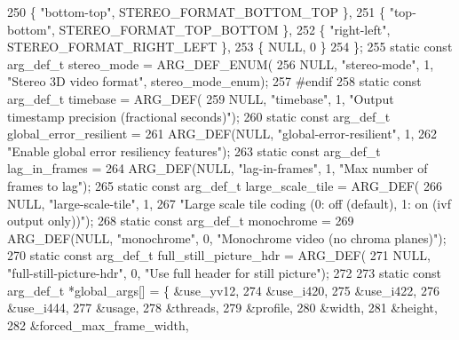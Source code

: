 \begin{DoxyCodeInclude}
{{250   \{ \textcolor{stringliteral}{"bottom-top"}, STEREO\_FORMAT\_BOTTOM\_TOP \},
251   \{ \textcolor{stringliteral}{"top-bottom"}, STEREO\_FORMAT\_TOP\_BOTTOM \},
252   \{ \textcolor{stringliteral}{"right-left"}, STEREO\_FORMAT\_RIGHT\_LEFT \},
253   \{ NULL, 0 \}
254 \};
255 \textcolor{keyword}{static} \textcolor{keyword}{const} arg\_def\_t stereo\_mode = ARG\_DEF\_ENUM(
256     NULL, \textcolor{stringliteral}{"stereo-mode"}, 1, \textcolor{stringliteral}{"Stereo 3D video format"}, stereo\_mode\_enum);
257 \textcolor{preprocessor}{#endif}
258 \textcolor{keyword}{static} \textcolor{keyword}{const} arg\_def\_t timebase = ARG\_DEF(
259     NULL, \textcolor{stringliteral}{"timebase"}, 1, \textcolor{stringliteral}{"Output timestamp precision (fractional seconds)"});
260 \textcolor{keyword}{static} \textcolor{keyword}{const} arg\_def\_t global\_error\_resilient =
261     ARG\_DEF(NULL, \textcolor{stringliteral}{"global-error-resilient"}, 1,
262             \textcolor{stringliteral}{"Enable global error resiliency features"});
263 \textcolor{keyword}{static} \textcolor{keyword}{const} arg\_def\_t lag\_in\_frames =
264     ARG\_DEF(NULL, \textcolor{stringliteral}{"lag-in-frames"}, 1, \textcolor{stringliteral}{"Max number of frames to lag"});
265 \textcolor{keyword}{static} \textcolor{keyword}{const} arg\_def\_t large\_scale\_tile = ARG\_DEF(
266     NULL, \textcolor{stringliteral}{"large-scale-tile"}, 1,
267     \textcolor{stringliteral}{"Large scale tile coding (0: off (default), 1: on (ivf output only))"});
268 \textcolor{keyword}{static} \textcolor{keyword}{const} arg\_def\_t monochrome =
269     ARG\_DEF(NULL, \textcolor{stringliteral}{"monochrome"}, 0, \textcolor{stringliteral}{"Monochrome video (no chroma planes)"});
270 \textcolor{keyword}{static} \textcolor{keyword}{const} arg\_def\_t full\_still\_picture\_hdr = ARG\_DEF(
271     NULL, \textcolor{stringliteral}{"full-still-picture-hdr"}, 0, \textcolor{stringliteral}{"Use full header for still picture"});
272 
273 \textcolor{keyword}{static} \textcolor{keyword}{const} arg\_def\_t *global\_args[] = \{ &use\_yv12,
274                                           &use\_i420,
275                                           &use\_i422,
276                                           &use\_i444,
277                                           &usage,
278                                           &threads,
279                                           &profile,
280                                           &width,
281                                           &height,
282                                           &forced\_max\_frame\_width,
}}
\end{DoxyCodeInclude}
